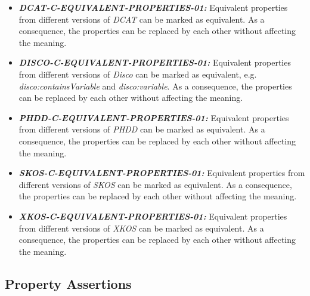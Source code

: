 \documentclass{llncs}
\begin{document}
\begin{itemize}
	\item \textbf{{\em DCAT-C-EQUIVALENT-PROPERTIES-01:}}
	Equivalent properties from different versions of \emph{DCAT} can be marked as equivalent. 
	As a consequence, the properties can be replaced by each other without affecting the meaning.
\end{itemize}

\begin{itemize}
	\item \textbf{{\em DISCO-C-EQUIVALENT-PROPERTIES-01:}}
	Equivalent properties from different versions of \emph{Disco} can be marked as equivalent, e.g. \emph{disco:containsVariable} and \emph{disco:variable}. 
	As a consequence, the properties can be replaced by each other without affecting the meaning.
\end{itemize}

\begin{itemize}
	\item \textbf{{\em PHDD-C-EQUIVALENT-PROPERTIES-01:}}
	Equivalent properties from different versions of \emph{PHDD} can be marked as equivalent. 
	As a consequence, the properties can be replaced by each other without affecting the meaning.
\end{itemize}

\begin{itemize}
	\item \textbf{{\em SKOS-C-EQUIVALENT-PROPERTIES-01:}}
	Equivalent properties from different versions of \emph{SKOS} can be marked as equivalent. 
	As a consequence, the properties can be replaced by each other without affecting the meaning.
\end{itemize}

\begin{itemize}
	\item \textbf{{\em XKOS-C-EQUIVALENT-PROPERTIES-01:}}
	Equivalent properties from different versions of \emph{XKOS} can be marked as equivalent. 
	As a consequence, the properties can be replaced by each other without affecting the meaning.
\end{itemize}

\subsection{Property Assertions}
\end{document}
